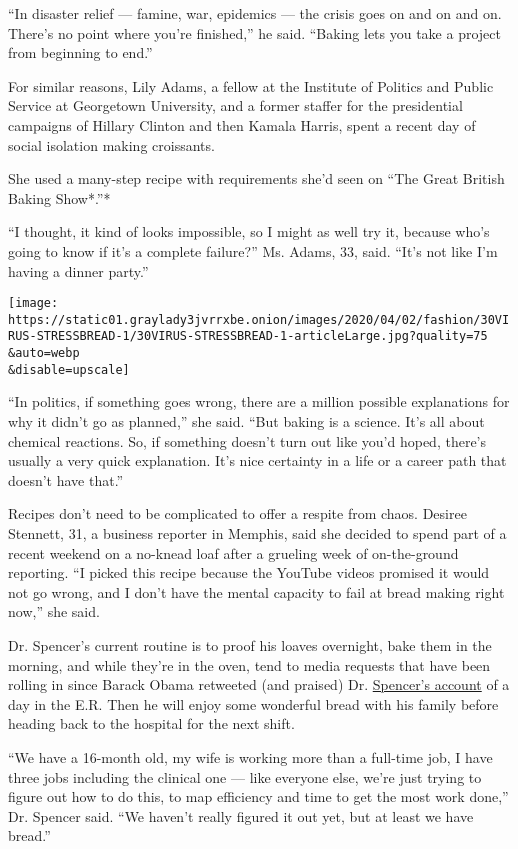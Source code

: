 ``In disaster relief --- famine, war, epidemics --- the crisis goes on
and on and on. There's no point where you're finished,'' he said.
``Baking lets you take a project from beginning to end.''

For similar reasons, Lily Adams, a fellow at the Institute of Politics
and Public Service at Georgetown University, and a former staffer for
the presidential campaigns of Hillary Clinton and then Kamala Harris,
spent a recent day of social isolation making croissants.

She used a many-step recipe with requirements she'd seen on ``The Great
British Baking Show*.''*

``I thought, it kind of looks impossible, so I might as well try it,
because who's going to know if it's a complete failure?'' Ms. Adams, 33,
said. ``It's not like I'm having a dinner party.''

\texttt{[image: https://static01.graylady3jvrrxbe.onion/images/2020/04/02/fashion/30VIRUS-STRESSBREAD-1/30VIRUS-STRESSBREAD-1-articleLarge.jpg?quality=75\\\&auto=webp\\\&disable=upscale]}

``In politics, if something goes wrong, there are a million possible
explanations for why it didn't go as planned,'' she said. ``But baking
is a science. It's all about chemical reactions. So, if something
doesn't turn out like you'd hoped, there's usually a very quick
explanation. It's nice certainty in a life or a career path that doesn't
have that.''

Recipes don't need to be complicated to offer a respite from chaos.
Desiree Stennett, 31, a business reporter in Memphis, said she decided
to spend part of a recent weekend on a no-knead loaf after a grueling
week of on-the-ground reporting. ``I picked this recipe because the
YouTube videos promised it would not go wrong, and I don't have the
mental capacity to fail at bread making right now,'' she said.

Dr. Spencer's current routine is to proof his loaves overnight, bake
them in the morning, and while they're in the oven, tend to media
requests that have been rolling in since Barack Obama retweeted (and
praised) Dr.
\href{https://twitter.com/Craig_A_Spencer/status/1242302400762908685}{Spencer's
account} of a day in the E.R. Then he will enjoy some wonderful bread
with his family before heading back to the hospital for the next shift.

``We have a 16-month old, my wife is working more than a full-time job,
I have three jobs including the clinical one --- like everyone else,
we're just trying to figure out how to do this, to map efficiency and
time to get the most work done,'' Dr. Spencer said. ``We haven't really
figured it out yet, but at least we have bread.''

